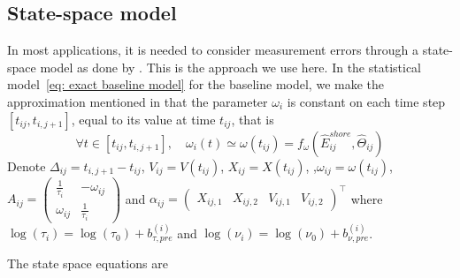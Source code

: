 \documentclass[11pt]{article}
\newcommand {\1}{\mathbb{1}}
\begin{document}
\subsection{State-space model}
\label{section: state space model}
In most applications, it is needed to consider measurement errors through a state-space model as done by \cite{johnson_continuoustime_2008}. This is the approach we use here. In the statistical model~\ref{eq: exact baseline model} for the baseline model, we make the approximation mentioned in \cite{michelot_varying-coefficient_2021} that the parameter $\omega_i$ is constant on each time step $[t_{ij},t_{i,j+1}]$, equal to its value at time $t_{ij}$, that is 
\[\forall t \in [t_{ij},t_{i,j+1}], \quad \omega_{i}(t) \simeq \omega(t_{ij})= f_{\omega}(\hat{E}^{shore}_{ij},\hat{\Theta}_{ij})\]
 Denote $\Delta_{ij}=t_{i,j+1}-t_{ij}$, $V_{ij}=V(t_{ij})$, $X_{ij}=X(t_{ij})$, ,$\omega_{ij}=\omega(t_{ij})$, $A_{ij}=\begin{pmatrix} 
	\frac{1}{\tau_{i}} & -\omega_{ij} \\
	\omega_{ij} & \frac{1}{\tau_{i}}
\end{pmatrix}$ and $\alpha_{ij}=\begin{pmatrix} X_{ij,1}  & X_{ij,2} & V_{ij,1} & V_{ij,2}\end{pmatrix}^\top$ where $\log(\tau_i)=\log(\tau_0)+b_{\tau,pre}^{(i)}$ and $\log(\nu_i)=\log(\nu_0)+b_{\nu,pre}^{(i)}$.

The state space equations are
\end{document}
